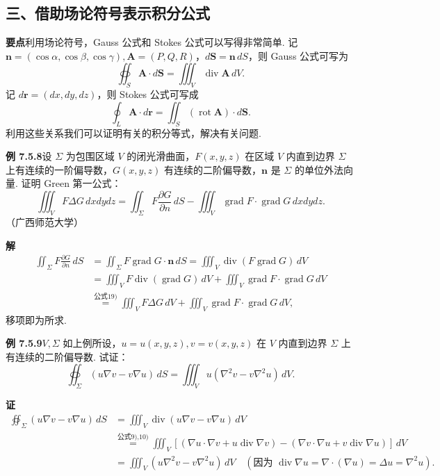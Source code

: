\documentclass[UTF8, 12pt, fontset=fandol, oneside]{ctexart}
\begin{document}
\subsection*{三、借助场论符号表示积分公式}

\noindent\textbf{要点}\quad 利用场论符号，Gauss 公式和 Stokes 公式可以写得非常简单. 记 $\mathbf n=(\cos\alpha,\cos\beta,\cos\gamma),\mathbf A=(P,Q,R)$，$d\mathbf S=\mathbf n\,dS$，则 Gauss 公式可写为
\[
\oiint_S \mathbf A\cdot d\mathbf S=\iiint_V \operatorname{div}\mathbf A\,dV.
\]
记 $d\mathbf r=(dx,dy,dz)$，则 Stokes 公式可写成
\[
\oint_L \mathbf A\cdot d\mathbf r=\iint_S(\operatorname{rot}\mathbf A)\cdot d\mathbf S.
\]
利用这些关系我们可以证明有关的积分等式，解决有关问题.

\noindent\textbf{例 7.5.8}\quad 设 $\Sigma$ 为包围区域 $V$ 的闭光滑曲面，$F(x,y,z)$ 在区域 $V$ 内直到边界 $\Sigma$ 上有连续的一阶偏导数，$G(x,y,z)$ 有连续的二阶偏导数，$\mathbf n$ 是 $\Sigma$ 的单位外法向量. 证明 Green 第一公式：
\[
\iiint_V F\Delta G\,dxdy dz=\iint_\Sigma F\frac{\partial G}{\partial n}\,dS-\iiint_V \operatorname{grad}F\cdot\operatorname{grad}G\,dxdy dz.
\]
（广西师范大学）

\noindent\textbf{解}\quad
\[
\begin{aligned}
\iint_\Sigma F\frac{\partial G}{\partial n}\,dS
&=\iint_\Sigma F\operatorname{grad}G\cdot\mathbf n\,dS
=\iiint_V\operatorname{div}(F\operatorname{grad}G)\,dV\\
&=\iiint_V F\operatorname{div}(\operatorname{grad}G)\,dV+\iiint_V\operatorname{grad}F\cdot\operatorname{grad}G\,dV\\
&\overset{\text{公式19)}}{=}\iiint_V F\Delta G\,dV+\iiint_V\operatorname{grad}F\cdot\operatorname{grad}G\,dV,
\end{aligned}
\]
移项即为所求.

\noindent\textbf{例 7.5.9}\quad $V,\Sigma$ 如上例所设，$u=u(x,y,z),v=v(x,y,z)$ 在 $V$ 内直到边界 $\Sigma$ 上有连续的二阶偏导数. 试证：
\[
\oiint_\Sigma(u\nabla v-v\nabla u)\,dS=\iiint_V u(\nabla^2v-v\nabla^2u)\,dV.
\]

\noindent\textbf{证}\quad
\[
\begin{aligned}
\oiint_\Sigma(u\nabla v-v\nabla u)\,dS
&=\iiint_V \operatorname{div}(u\nabla v-v\nabla u)\,dV\\
&\overset{\text{公式9),10)}}{=}\iiint_V\left[(\nabla u\cdot\nabla v+u\operatorname{div}\nabla v)-(\nabla v\cdot\nabla u+v\operatorname{div}\nabla u)\right]\,dV\\
&=\iiint_V(u\nabla^2v-v\nabla^2u)\,dV
\quad(\text{因为 }\operatorname{div}\nabla u=\nabla\cdot(\nabla u)=\Delta u=\nabla^2u).
\end{aligned}
\]
\end{document}
